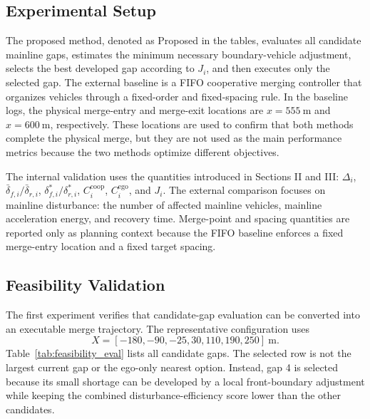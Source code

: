 \documentclass[conference]{IEEEtran}
\begin{document}
\subsection{Experimental Setup}
The proposed method, denoted as Proposed in the tables, evaluates all candidate
mainline gaps, estimates the minimum necessary boundary-vehicle adjustment,
selects the best developed gap according to \(J_i\), and then executes only the
selected gap. The external baseline is a FIFO cooperative merging controller
that organizes vehicles through a fixed-order and fixed-spacing rule. In the
baseline logs, the physical merge-entry and merge-exit locations are
\(x=555~\mathrm{m}\) and \(x=600~\mathrm{m}\), respectively. These locations
are used to confirm that both methods complete the physical merge, but they are
not used as the main performance metrics because the two methods optimize
different objectives.

The internal validation uses the quantities introduced in Sections II and III:
\(\Delta_i\), \(\bar{\delta}_{f,i}/\bar{\delta}_{r,i}\),
\(\delta_{f,i}^*/\delta_{r,i}^*\), \(C_i^{\mathrm{coop}}\),
\(C_i^{\mathrm{ego}}\), and \(J_i\). The external comparison focuses on
mainline disturbance: the number of affected mainline vehicles, mainline
acceleration energy, and recovery time. Merge-point and spacing quantities are
reported only as planning context because the FIFO baseline enforces a fixed
merge-entry location and a fixed target spacing.

\subsection{Feasibility Validation}
The first experiment verifies that candidate-gap evaluation can be converted
into an executable merge trajectory. The representative configuration uses
\[
    X=[-180,-90,-25,30,110,190,250]~\mathrm{m}.
\]
Table~\ref{tab:feasibility_eval} lists all candidate gaps. The selected row is
not the largest current gap or the ego-only nearest option. Instead, gap 4 is
selected because its small shortage can be developed by a local front-boundary
adjustment while keeping the combined disturbance-efficiency score lower than
the other candidates.
\end{document}
